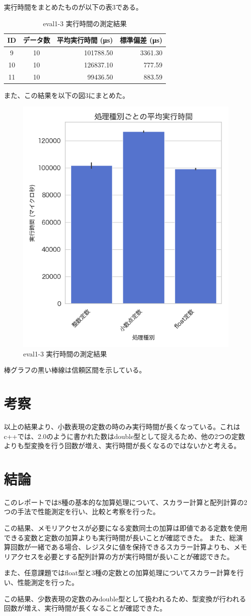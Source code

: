 \documentclass [11pt,a4paper,dvipdfmx]{ujarticle}
\begin{document}
実行時間をまとめたものが以下の表3である。
\begin{table}[htbp]
  \centering
  \caption{eval1-3 実行時間の測定結果}
  \label{tab:eval1-3-results-id}
  \begin{tabular}{ccrr}
    \toprule
    ID & データ数 & 平均実行時間 (μs) & 標準偏差 (μs) \\
    \midrule
    9  & 10 & 101788.50 & 3361.30 \\
    10 & 10 & 126837.10 & 777.59 \\
    11 & 10 & 99436.50 & 883.59 \\
    \bottomrule
  \end{tabular}
\end{table}

また、この結果を以下の図3にまとめた。
\begin{figure}[htbp]
  \centering
  \includegraphics[width=0.4\linewidth]{result1-3.png}
  \caption{eval1-3 実行時間の測定結果}
\end{figure}

棒グラフの黒い棒線は信頼区間を示している。
\clearpage
\section{考察}
以上の結果より、小数表現の定数の時のみ実行時間が長くなっている。これはc++では、2.0のように書かれた数はdouble型として捉えるため、他の2つの定数よりも型変換を行う回数が増え、実行時間が長くなるのではないかと考える。

\section{結論}
このレポートでは8種の基本的な加算処理について、スカラー計算と配列計算の2つの手法で性能測定を行い、比較と考察を行った。

この結果、メモリアクセスが必要になる変数同士の加算は即値である定数を使用できる変数と定数の加算よりも実行時間が長いことが確認できた。
また、総演算回数が一緒である場合、レジスタに値を保持できるスカラー計算よりも、メモリアクセスを必要とする配列計算の方が実行時間が長いことが確認できた。

また、任意課題ではfloat型と3種の定数との加算処理についてスカラー計算を行い、性能測定を行った。

この結果、少数表現の定数のみdouble型として扱われるため、型変換が行われる回数が増え、実行時間が長くなることが確認できた。
\end{document}
